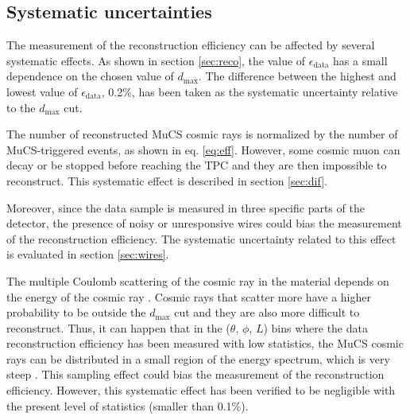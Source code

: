 \documentclass[a4paper,11pt]{article}
\begin{document}
\subsection{Systematic uncertainties}
The measurement of the reconstruction efficiency can be affected by several systematic effects.
As shown in section \ref{sec:reco}, the value of $\epsilon_{\mathrm{data}}$ has a small dependence on the chosen value of $d_{\mathrm{max}}$. The difference between the highest and lowest value of $\epsilon_{\mathrm{data}}$, 0.2\%, has been taken as the systematic uncertainty relative to the $d_{\mathrm{max}}$ cut.

The number of reconstructed MuCS cosmic rays is normalized by the number of MuCS-triggered events, as shown in eq. \eqref{eq:eff}. However, some cosmic muon can decay or be stopped before reaching the TPC and they are then impossible to reconstruct. This systematic effect is described in section \ref{sec:dif}.

Moreover, since the data sample is measured in three specific parts of the detector, the presence of noisy or unresponsive wires could bias the measurement of the reconstruction efficiency. The systematic uncertainty related to this effect is evaluated in section \ref{sec:wires}.

The multiple Coulomb scattering of the cosmic ray in the material depends on the energy of the cosmic ray \cite{pdg}. Cosmic rays that scatter more have a higher probability to be outside the $d_{\mathrm{max}}$ cut and they are also more difficult to reconstruct. Thus, it can happen that in the ($\theta$, $\phi$, $L$) bins where the data reconstruction efficiency has been measured with low statistics, the MuCS cosmic rays can be distributed in a small region of the energy spectrum, which is very steep \cite{corsika}. This sampling effect could bias the measurement of the reconstruction efficiency. However,  this systematic effect has been verified to be negligible with the present level of statistics (smaller than 0.1\%).
\end{document}
